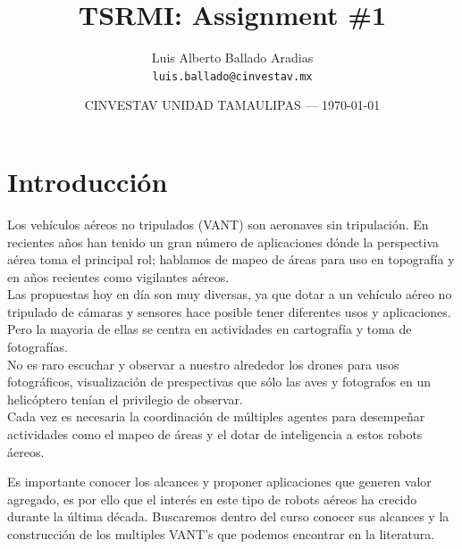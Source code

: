 \documentclass{article}
\title{TSRMI: Assignment \#1} %
\author{Luis Alberto Ballado Aradias\\ \texttt{luis.ballado@cinvestav.mx}} %
\date{CINVESTAV UNIDAD TAMAULIPAS --- \today} %
\begin{document}
\maketitle %


\section*{Introducción} %

Los vehículos aéreos no tripulados (VANT) son aeronaves sin tripulación. En recientes años han tenido un gran número de aplicaciones dónde la perspectiva aérea toma el principal rol; hablamos de mapeo de áreas para uso en topografía y en años recientes como vigilantes aéreos.\\

Las propuestas hoy en día son muy diversas, ya que dotar a un vehículo aéreo no tripulado de cámaras y sensores hace posible tener diferentes usos y aplicaciones. Pero la mayoria de ellas se centra en actividades en cartografía y toma de fotografías.\\

No es raro escuchar y observar a nuestro alrededor los drones para usos fotográficos, visualización de prespectivas que sólo las aves y fotografos en un helicóptero tenían el privilegio de observar.\\

Cada vez es necesaria la coordinación de múltiples agentes para desempeñar actividades como el mapeo de áreas y el dotar de inteligencia a estos robots áereos.

\begin{info} %
  Es importante conocer los alcances y proponer aplicaciones que generen valor agregado, es por ello que el interés en este tipo de robots aéreos ha crecido durante la última década. Buscaremos dentro del curso conocer sus alcances y la construcción de los multiples VANT's que podemos encontrar en la literatura.
\end{info}

\end{document}
